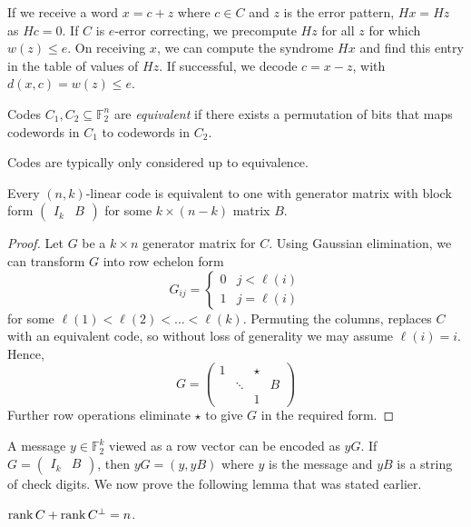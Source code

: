 If we receive a word \( x = c + z \) where \( c \in C \) and \( z \) is the error pattern, \( Hx = Hz \) as \( Hc = 0 \).
If \( C \) is \( e \)-error correcting, we precompute \( Hz \) for all \( z \) for which \( w(z) \leq e \).
On receiving \( x \), we can compute the syndrome \( Hx \) and find this entry in the table of values of \( Hz \).
If successful, we decode \( c = x - z \), with \( d(x,c) = w(z) \leq e \).
\begin{definition}
    Codes \( C_1, C_2 \subseteq \mathbb F_2^n \) are \emph{equivalent} if there exists a permutation of bits that maps codewords in \( C_1 \) to codewords in \( C_2 \).
\end{definition}
Codes are typically only considered up to equivalence.
\begin{lemma}
    Every \( (n, k) \)-linear code is equivalent to one with generator matrix with block form \( \begin{pmatrix}
        I_k & B
    \end{pmatrix} \) for some \( k \times (n - k) \) matrix \( B \).
\end{lemma}
\begin{proof}
    Let \( G \) be a \( k \times n \) generator matrix for \( C \).
    Using Gaussian elimination, we can transform \( G \) into row echelon form
    \[ G_{ij} = \begin{cases}
        0 & j < \ell(i) \\
        1 & j = \ell(i)
    \end{cases} \]
    for some \( \ell(1) < \ell(2) < \dots < \ell(k) \).
    Permuting the columns, replaces \( C \) with an equivalent code, so without loss of generality we may assume \( \ell(i) = i \).
    Hence,
    \[ G = \begin{pmatrix}
        1 & & \star \\
        & \ddots & & B \\
        & & 1
    \end{pmatrix} \]
    Further row operations eliminate \( \star \) to give \( G \) in the required form.
\end{proof}
A message \( y \in \mathbb F_2^k \) viewed as a row vector can be encoded as \( yG \).
If \( G = \begin{pmatrix}
    I_k & B
\end{pmatrix} \), then \( yG = (y, yB) \) where \( y \) is the message and \( yB \) is a string of check digits.
We now prove the following lemma that was stated earlier.
\begin{lemma}
    \( \rank C + \rank C^\perp = n \).
\end{lemma}
